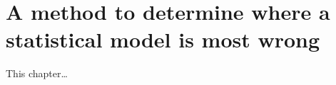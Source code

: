 
\inbpdocument

\chapter{A method to determine where a statistical model is most wrong}
\label{ch:criticism}

This chapter\dots

\outbpdocument{


}
